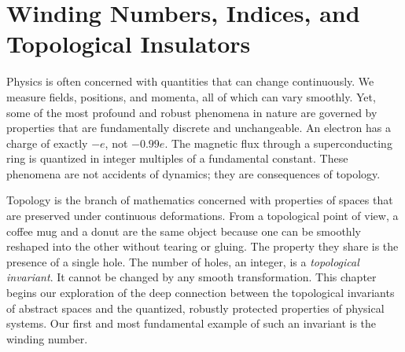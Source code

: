 \chapter{Winding Numbers, Indices, and Topological Insulators}
\label{chap:winding_numbers}

Physics is often concerned with quantities that can change continuously.
We measure fields, positions, and momenta, all of which can vary smoothly.
Yet, some of the most profound and robust phenomena in nature are governed by properties that are fundamentally discrete and unchangeable.
An electron has a charge of exactly $-e$, not $-0.99e$.
The magnetic flux through a superconducting ring is quantized in integer multiples of a fundamental constant.
These phenomena are not accidents of dynamics; they are consequences of topology.

Topology is the branch of mathematics concerned with properties of spaces that are preserved under continuous deformations.
From a topological point of view, a coffee mug and a donut are the same object because one can be smoothly reshaped into the other without tearing or gluing.
The property they share is the presence of a single hole.
The number of holes, an integer, is a \textit{topological invariant}.
It cannot be changed by any smooth transformation.
This chapter begins our exploration of the deep connection between the topological invariants of abstract spaces and the quantized, robustly protected properties of physical systems.
Our first and most fundamental example of such an invariant is the winding number.
 
 







